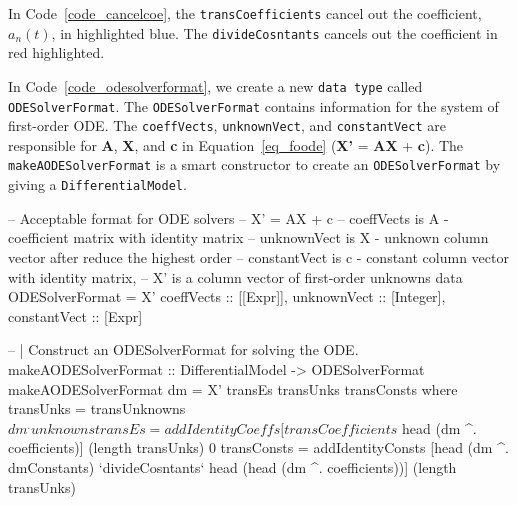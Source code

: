 In Code~\ref{code_cancelcoe}, the \verb|transCoefficients| cancel out the coefficient, $a_n(t)$, in highlighted blue. The \verb|divideCosntants| cancels out the coefficient in red highlighted.
\begin{listing}[ht]
\label{code_cancelcoe}
\end{listing}

In Code~\ref{code_odesolverformat}, we create a new \verb|data type| called \verb|ODESolverFormat|. The \verb|ODESolverFormat| contains information for the system of first-order ODE. The \verb|coeffVects|, \verb|unknownVect|, and \verb|constantVect| are responsible for \textbf{A}, \textbf{X}, and \textbf{c} in Equation~\ref{eq_foode} (\textbf{X'} = \textbf{AX} + \textbf{c}). The \verb|makeAODESolverFormat| is a smart constructor to create an \verb|ODESolverFormat| by giving a \verb|DifferentialModel|.

\begin{listing}[ht]
\begin{haskell1}
-- Acceptable format for ODE solvers
-- X' = AX + c
-- coeffVects is A - coefficient matrix with identity matrix
-- unknownVect is X - unknown column vector after reduce the highest order
-- constantVect is c - constant column vector with identity matrix, 
-- X' is a column vector of first-order unknowns
data ODESolverFormat = X'{
  coeffVects :: [[Expr]],
  unknownVect :: [Integer],
  constantVect :: [Expr]
}

-- | Construct an ODESolverFormat for solving the ODE.
makeAODESolverFormat :: DifferentialModel -> ODESolverFormat
makeAODESolverFormat dm = X' transEs transUnks transConsts
  where transUnks = transUnknowns $ dm ^. unknowns
        transEs = addIdentityCoeffs [transCoefficients $ head (dm ^. coefficients)] (length transUnks) 0
        transConsts = addIdentityConsts [head (dm ^. dmConstants) `divideCosntants` head (head (dm ^. coefficients))] (length transUnks)
\end{haskell1}
\label{code_odesolverformat}
\end{listing}

